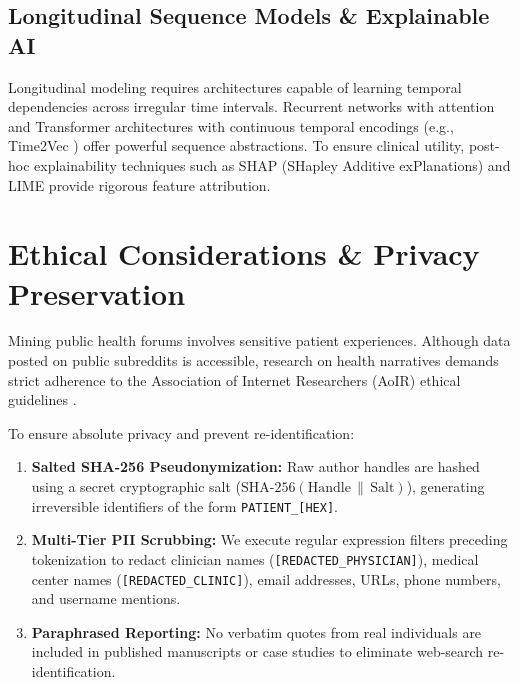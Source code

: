 \documentclass[runningheads]{llncs}
\begin{document}
\subsection{Longitudinal Sequence Models \& Explainable AI}
Longitudinal modeling requires architectures capable of learning temporal dependencies across irregular time intervals. Recurrent networks with attention \cite{bahdanau2014neural} and Transformer architectures \cite{vaswani2017attention} with continuous temporal encodings (e.g., Time2Vec \cite{kazemi2019time2vec}) offer powerful sequence abstractions. To ensure clinical utility, post-hoc explainability techniques such as SHAP (SHapley Additive exPlanations) \cite{lundberg2017unified} and LIME \cite{ribeiro2016should} provide rigorous feature attribution.

\section{Ethical Considerations \& Privacy Preservation}
\label{sec:ethics}

Mining public health forums involves sensitive patient experiences. Although data posted on public subreddits is accessible, research on health narratives demands strict adherence to the Association of Internet Researchers (AoIR) ethical guidelines \cite{franzke2020internet}.

To ensure absolute privacy and prevent re-identification:
\begin{enumerate}
    \item \textbf{Salted SHA-256 Pseudonymization:} Raw author handles are hashed using a secret cryptographic salt ($\text{SHA-256}(\text{Handle} \,\|\, \text{Salt})$), generating irreversible identifiers of the form \texttt{PATIENT\_[HEX]}.
    \item \textbf{Multi-Tier PII Scrubbing:} We execute regular expression filters preceding tokenization to redact clinician names (\texttt{[REDACTED\_PHYSICIAN]}), medical center names (\texttt{[REDACTED\_CLINIC]}), email addresses, URLs, phone numbers, and username mentions.
    \item \textbf{Paraphrased Reporting:} No verbatim quotes from real individuals are included in published manuscripts or case studies to eliminate web-search re-identification.
\end{enumerate}
\end{document}
